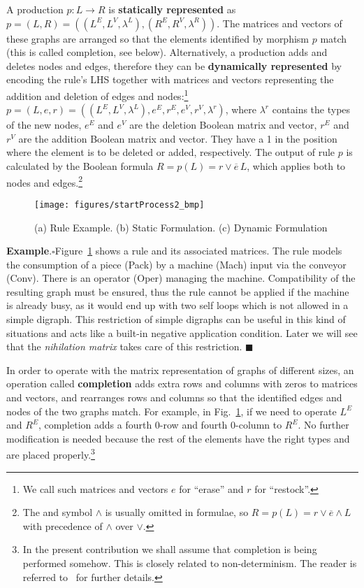 \documentclass{fundam}
\newcommand{\proofend}{\hfill$\blacksquare$}
\begin{document}
A production $p:L \rightarrow R$ is \textbf{statically represented} as
$p = (L, R) = \left( \left( L^E, L^V, \lambda^L \right), \left( R^E,
  R^V, \lambda^R \right) \right)$. The matrices and vectors of these graphs are arranged so
that the elements identified by morphism $p$ match (this is called
completion, see below). Alternatively, a production adds and deletes
nodes and edges, therefore they can be \textbf{dynamically represented}
by encoding the rule's LHS together with matrices and vectors
representing the addition and deletion of edges and nodes:\footnote{We
  call such matrices and vectors $e$ for ``erase'' and $r$ for
  ``restock''.} $p = (L, e, r) = \left( \left( L^E, L^V, \lambda^L
  \right), e^E, r^E, e^V, r^V, \lambda^r \right)$, where $\lambda^r$
contains the types of the new nodes, $e^E$ and $e^V$ are the deletion
Boolean matrix and vector, $r^E$ and $r^V$ are the addition Boolean
matrix and vector. They have a 1 in the position where the element is
to be deleted or added, respectively. The output of rule $p$ is
calculated by the Boolean formula $R = p(L) = r \vee \overline{e} \,
L$, which applies both to nodes and edges.\footnote{The and symbol
  $\wedge$ is usually omitted in formulae, so $R = p(L) = r \vee
  \overline{e} \wedge L$ with precedence of $\wedge$ over $\vee$.}

\begin{figure}[htbp]
  \centering
  \texttt{[image: figures/startProcess2\_bmp]}
  \caption{(a) Rule Example. (b) Static Formulation. (c) Dynamic
    Formulation}
  \label{fig:example_rule}
\end{figure}

\noindent \textbf{Example}.$\square$Figure~\ref{fig:example_rule}
shows a rule and its associated matrices. The rule models the
consumption of a piece (Pack) by a machine (Mach) input via the
conveyor (Conv). There is an operator (Oper) managing the
machine. Compatibility of the resulting graph must be ensured, thus
the rule cannot be applied if the machine is already busy, as it would
end up with two self loops which is not allowed in a simple digraph.
This restriction of simple digraphs can be useful in this kind of
situations and acts like a built-in negative application
condition. Later we will see that the \emph{nihilation matrix} takes
care of this restriction. \proofend

In order to operate with the matrix representation of graphs of
different sizes, an operation called \textbf{completion} adds extra
rows and columns with zeros to matrices and vectors, and rearranges
rows and columns so that the identified edges and nodes of the two
graphs match.  For example, in Fig.~\ref{fig:example_rule}, if we need
to operate $L^E$ and $R^E$, completion adds a fourth $0$-row and
fourth $0$-column to $R^E$. No further modification is needed because
the rest of the elements have the right types and are placed
properly.\footnote{In the present contribution we shall assume that
  completion is being performed somehow. This is closely related to
non-determinism. The reader is referred to~\cite{MGGmodel} for further
details.}
\end{document}
